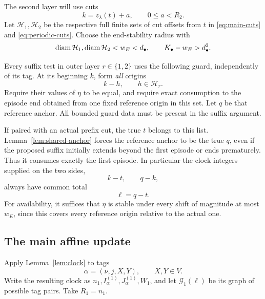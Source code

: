 The second layer will use cuts
\begin{equation}\label{eq:periodic-cuts}
                     k=z_\lambda(t)+a,\qquad 0\le a<R_2.
\end{equation}
Let \(\mathcal H_1,\mathcal H_2\) be the respective full finite sets of cut
offsets from \(t\) in \eqref{eq:main-cuts} and \eqref{eq:periodic-cuts}.
Choose the end-stability radius with
\[
              \operatorname{diam}\mathcal H_1,\operatorname{diam}\mathcal H_2<w_E<d_\bullet,
 \qquad K_\bullet-w_E>d_\bullet^2.
\]

Every suffix test in outer layer \(r\in\{1,2\}\) uses the following guard,
independently of its tag. At its beginning \(k\), form \emph{all} origins
\[
                         k-h,\qquad h\in\mathcal H_r.
\]
Require their values of \(\eta\) to be equal, and require exact consumption
to the episode end obtained from one fixed reference origin in this set.
Let \(q\) be that reference anchor. All bounded guard data must be present
in the suffix argument.

If paired with an actual prefix cut, the true \(t\) belongs to this list.
Lemma~\ref{lem:shared-anchor} forces the reference anchor to be the true \(q\),
even if the proposed suffix initially extends beyond the first episode or
ends prematurely. Thus it consumes exactly the first episode. In particular
the clock integers supplied on the two sides,
\[
                            k-t,\qquad q-k,
\]
always have common total
\begin{equation}\label{eq:clock-total}
                              \ell=q-t.
\end{equation}
For availability, it suffices that \(\eta\) is stable under every shift of
magnitude at most \(w_E\), since this covers every reference origin relative
to the actual one.

\subsection{The main affine update}

Apply Lemma~\ref{lem:clock} to tags
\[
                 \alpha=(\nu,j,X,Y),\qquad X,Y\in V.
\]
Write the resulting clock as \(n_1,I^{(1)}_\alpha,J^{(1)}_\alpha,W_1\),
and let \(\mathcal G_1(\ell)\) be its graph of possible tag pairs.
Take \(R_1=n_1\).

